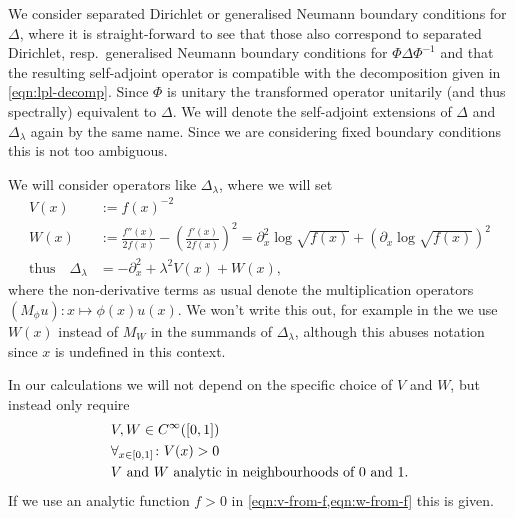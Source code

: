 We consider separated Dirichlet or generalised Neumann boundary conditions for
$\Delta$, where it is straight-forward to see that those also correspond to
separated Dirichlet, resp.\ generalised Neumann boundary conditions for
$\Phi\Delta\Phi^{-1}$ and that the resulting self-adjoint operator is compatible
with the decomposition given in \cref{eqn:lpl-decomp}. Since $\Phi$ is unitary the transformed
operator unitarily (and thus spectrally) equivalent to $\Delta$. We will denote
the self-adjoint extensions of $\Delta$ and $\Delta_\lambda$ again by the same
name. Since we are considering fixed boundary conditions this is not too
ambiguous.

We will consider operators like $\Delta_\lambda$, where we will set
\begin{align}
  \label{eqn:v-from-f}
  V(x) &:= f(x)^{-2} \\
  \label{eqn:w-from-f}
  W(x) &:= \frac{f''(x)}{2f(x)} - \left(\frac{f'(x)}{2f(x)}\right)^2 =
    \partial_x^2 \log\sqrt{f(x)} + \left(\partial_x \log\sqrt{f(x)}\right)^2 \\
  \label{eqn:d_lambda}
  \text{thus}\quad \Delta_\lambda &= -\partial^2_x + \lambda^2 V(x) + W(x),
\end{align}
where the non-derivative terms as usual denote the multiplication operators
$(M_\phi u)\colon x \mapsto \phi(x)u(x)$. We won't write this out, for example
in the we use $W(x)$ instead of $M_W$ in the summands of $\Delta_\lambda$,
although this abuses notation since $x$ is undefined in this context.

In our calculations we will not depend on the specific choice of $V$ and $W$,
but instead only require
\begin{equation*}
  \begin{split}
    &V,W\in C^\infty_{}([0,1]) \\
    &\forall_{x\in[0,1]}\colon V(x) > 0 \\
    &V\text{ and }W\text{ analytic in neighbourhoods of $0$ and $1$}.
  \end{split}
\end{equation*}
If we use an analytic function $f>0$ in \cref{eqn:v-from-f,eqn:w-from-f} this is
given.

